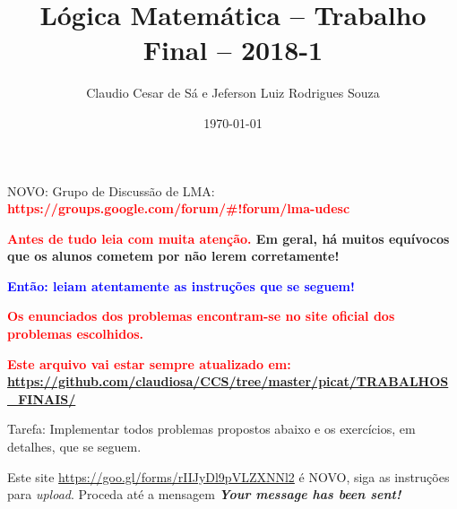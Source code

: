 \documentclass[a4paper,12pt]{article}
\title{Lógica Matemática -- Trabalho Final -- 2018-1}
\author{Claudio Cesar de Sá e Jeferson Luiz Rodrigues Souza}
\date{\today}
\begin{document}
\maketitle

\begin{flushleft}


\vspace{0.5cm}
 NOVO: Grupo de Discussão de LMA:\\
 {\bf \textcolor{red}{ https://groups.google.com/forum/\#!forum/lma-udesc }}


\vspace{0.5cm}
  {\bf \textcolor{red}{
Antes de tudo leia com \textbf{muita atenção}.} Em geral, há muitos equívocos
que os alunos cometem por não lerem corretamente!}


\vspace{0.5cm}
 {\bf \textcolor{blue}{Então: leiam atentamente as
instruções que se seguem!}}


\vspace{0.5cm}
  {\bf \textcolor{red}{Os enunciados dos problemas encontram-se no site oficial dos problemas escolhidos.}}


\vspace{0.5cm}
  {\bf \textcolor{red}{Este arquivo vai estar sempre atualizado em: }}\\
{\bf \textcolor{red}{\url{https://github.com/claudiosa/CCS/tree/master/picat/TRABALHOS_FINAIS/}}}

\vspace{0.5cm}
 Tarefa: Implementar todos  
 problemas propostos abaixo e os exercícios, em detalhes, que se seguem. 



\vspace{0.5cm}
  Este site  \textcolor{red}{\url{https://goo.gl/forms/rIIJyDl9pVLZXNNl2}} é NOVO, siga as instruções para \emph{upload}. Proceda até
a mensagem \textbf{ \emph{Your message has been sent!}}



\end{flushleft}
\end{document}
